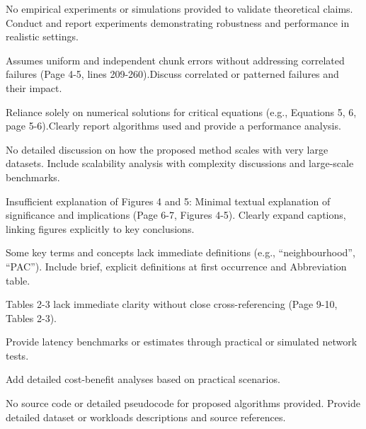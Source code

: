 \documentclass[11pt]{article}
\newcommand{\us}{\rm \setlength{\leftskip}{0.3cm} \setlength{\rightskip}{0.3cm}}
\newcommand{\them}{\it \setlength{\leftskip}{0cm} \setlength{\rightskip}{0cm}}
\begin{document}
\us

\them

No empirical experiments or simulations provided to validate theoretical claims. Conduct and report experiments demonstrating robustness and performance in realistic settings.

\us

\them

Assumes uniform and independent chunk errors without addressing correlated failures (Page 4-5, lines 209-260).Discuss correlated or patterned failures and their impact.

\us

\them

Reliance solely on numerical solutions for critical equations (e.g., Equations 5, 6, page 5-6).Clearly report algorithms used and provide a performance analysis.

\us

\them

No detailed discussion on how the proposed method scales with very large datasets. Include scalability analysis with complexity discussions and large-scale benchmarks.

\us

\them

Insufficient explanation of Figures 4 and 5: Minimal textual explanation of significance and implications (Page 6-7, Figures 4-5). Clearly expand captions, linking figures explicitly to key conclusions.

\us

\them

Some key terms and concepts lack immediate definitions (e.g., ``neighbourhood'', ``PAC''). Include brief, explicit definitions at first occurrence and Abbreviation table.

\us

\them

Tables 2-3 lack immediate clarity without close cross-referencing (Page 9-10, Tables 2-3).

\us

\them

Provide latency benchmarks or estimates through practical or simulated network tests.

\us

\them

Add detailed cost-benefit analyses based on practical scenarios.

\us

\them

No source code or detailed pseudocode for proposed algorithms provided. Provide detailed dataset or workloads descriptions and source references.
\end{document}
